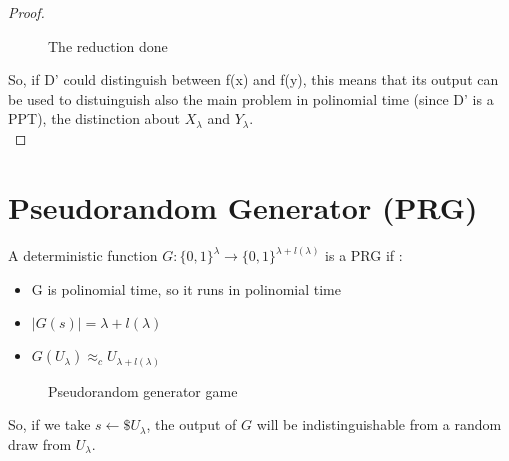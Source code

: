 \begin{proof}
\begin{figure}[h!]
   \caption{The reduction done}
   \label{fig:red1}
\end{figure}
So, if D' could distinguish between f(x) and f(y), this means that its output
can be used to distuinguish also the main problem  in polinomial time (since D'
is a PPT), the distinction about
$X_{\lambda}$ and $Y_{\lambda}$.\\
\end{proof}
\section{Pseudorandom Generator (PRG)}

A deterministic function $G:\{0,1\}^{\lambda} \to \{0,1\}^{\lambda + l(
\lambda)} $ is a PRG if :
\begin{itemize}
    \item G is polinomial time, so it runs in polinomial time
    \item $| G(s) | = \lambda + l(\lambda)$
    \item $G(U_{\lambda}) \approx_{c} U_{\lambda + l(\lambda)}$
\end{itemize}


\begin{figure}[h!]
   \centering
   \sdinit{}
   \caption{Pseudorandom generator game }
   \label{fig:prggame}
\end{figure}

So, if we take $s \leftarrow\$ U_{\lambda}$, the output of $G$ will be
indistinguishable from a random draw from $U_{\lambda}$.\\
